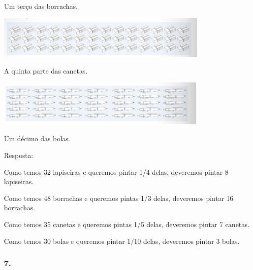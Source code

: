 \begin{mdframed}[linewidth=2pt,linecolor=salmao,roundcorner=2pt]
\begin{escolha}
{{%

\begin{escolha}
\item
  Um terço das borrachas.
\end{escolha}

\includegraphics[width=4.08369in,height=0.81674in]{media/image112.png}


\begin{escolha}
\item
  A quinta parte das canetas.
\end{escolha}

\includegraphics[width=4.06702in,height=0.89174in]{media/image113.png}


\begin{escolha}
\item
  Um décimo das bolas.
\end{escolha}


Resposta:

\begin{escolha}
\item
  Como temos 32 lapiseiras e queremos pintar 1/4 delas, deveremos pintar 8
  lapiseiras.
\item
  Como temos 48 borrachas e queremos pintas 1/3 delas, deveremos pintar
  16 borrachas.
\item
  Como temos 35 canetas e queremos pintas 1/5 delas, deveremos pintar 7
  canetas.
\item
  Como temos 30 bolas e queremos pintar 1/10 delas, deveremos pintar 3
  bolas.
\end{escolha}

\subsubsection{7. }

}}
\end{escolha}
\end{mdframed}
